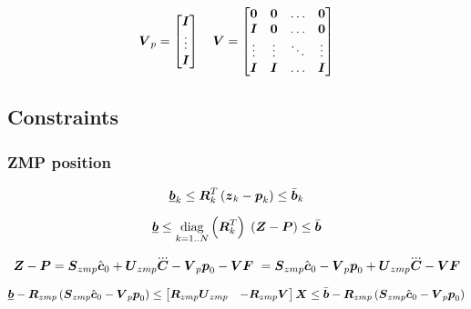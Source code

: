 \begin{equation*}
    \mbox{\boldmath $V$}_p = 
    \begin{bmatrix}
        \mbox{\boldmath $I$}\\
        \vdots\\
        \mbox{\boldmath $I$}\\
    \end{bmatrix}
    \quad
    \mbox{\boldmath $V$} = 
    \begin{bmatrix}
        \mbox{\boldmath $0$}   &   \mbox{\boldmath $0$}   & \dots     & \mbox{\boldmath $0$} \\
        \mbox{\boldmath $I$}   &   \mbox{\boldmath $0$}   & \dots     & \mbox{\boldmath $0$} \\
        \vdots  &   \vdots  & \ddots    & \vdots \\
        \mbox{\boldmath $I$}   &   \mbox{\boldmath $I$}   & \dots     & \mbox{\boldmath $I$} \\
    \end{bmatrix}
\end{equation*}



\subsection{Constraints}

\subsubsection{ZMP position}
\begin{equation*}
    \underline{\mbox{\boldmath $b$}}_k \le \mbox{\boldmath $R$}_k^T \left( \mbox{\boldmath $z$}_k - \mbox{\boldmath $p$}_k \right) \le \bar{\mbox{\boldmath $b$}}_k\\
\end{equation*}

\begin{equation*}
    \underbar{\mbox{\boldmath $b$}} 
    \le 
    \underset{k = 1..N}{\operatorname{diag}}\left(\mbox{\boldmath $R$}_k^T\right)\;
    \left(
        \mbox{\boldmath $Z$}
        -
        \mbox{\boldmath $P$}
    \right) 
    \le
    \bar{\mbox{\boldmath $b$}}
\end{equation*}


\begin{equation*}
    \ZMP - \FP 
    =
    \M{S}_{zmp} \cstate_0  +  \M{U}_{zmp} \cJerk - \M{V}_p \fp_0 - \M{V} \FD\
    =
    \M{S}_{zmp} \cstate_0 - \M{V}_p \fp_0
    +
    \M{U}_{zmp} \cJerk - \M{V} \FD
\end{equation*}

\begin{equation*}
    \underbar{\mbox{\boldmath $b$}} 
    -
    \mbox{\boldmath $R$}_{zmp}
    \left(
        \mbox{\boldmath $S$}_{zmp} \hat{\mbox{\boldmath $c$}}_0 - \mbox{\boldmath $V$}_p \mbox{\boldmath $p$}_0
    \right)
    \le 
    \begin{bmatrix}
        \mbox{\boldmath $R$}_{zmp} \mbox{\boldmath $U$}_{zmp} & - \mbox{\boldmath $R$}_{zmp} \mbox{\boldmath $V$} \\
    \end{bmatrix}
    \mbox{\boldmath $X$}
    \le
    \bar{\mbox{\boldmath $b$}}
    -
    \mbox{\boldmath $R$}_{zmp}
    \left(
        \mbox{\boldmath $S$}_{zmp} \hat{\mbox{\boldmath $c$}}_0 - \mbox{\boldmath $V$}_p \mbox{\boldmath $p$}_0
    \right)
\end{equation*}


